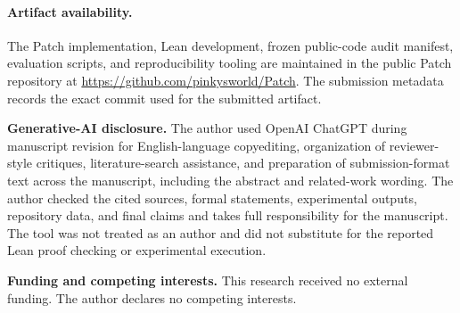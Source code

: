 \paragraph{Artifact availability.} The Patch implementation, Lean development, frozen public-code audit manifest, evaluation scripts, and reproducibility tooling are maintained in the public Patch repository at \url{https://github.com/pinkysworld/Patch}. The submission metadata records the exact commit used for the submitted artifact.

\acks
\textbf{Generative-AI disclosure.} The author used OpenAI ChatGPT during manuscript revision for English-language copyediting, organization of reviewer-style critiques, literature-search assistance, and preparation of submission-format text across the manuscript, including the abstract and related-work wording. The author checked the cited sources, formal statements, experimental outputs, repository data, and final claims and takes full responsibility for the manuscript. The tool was not treated as an author and did not substitute for the reported Lean proof checking or experimental execution.

\textbf{Funding and competing interests.} This research received no external funding. The author declares no competing interests.
